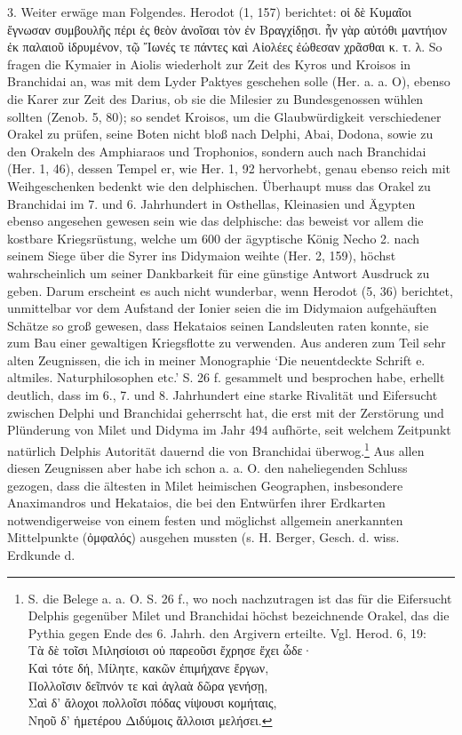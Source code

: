 \documentclass[a4paper, 11pt, oneside]{article}
\begin{document}
3. Weiter erwäge man Folgendes. Herodot (1, 157) berichtet: οἱ δὲ Κυμαῖοι ἔγνωσαν συμβουλῆς πέρι ἐς θεὸν ἀνοῖσαι τὸν ἐν Βραγχίδῃσι. ἦν γὰρ αὐτόθι μαντήιον ἐκ παλαιοῦ ἰδρυμένον, τῷ Ἴωνές τε πάντες καὶ Αἰολέες ἐώθεσαν χρᾶσθαι κ. τ. λ. So fragen die Kymaier in Aiolis wiederholt zur Zeit des Kyros und Kroisos in Branchidai an, was mit dem Lyder Paktyes geschehen solle (Her. a. a. O), ebenso die Karer zur Zeit des Darius, ob sie die Milesier zu Bundesgenossen wühlen sollten (Zenob. 5, 80); so sendet Kroisos, um die Glaubwürdigkeit verschiedener Orakel zu prüfen, seine Boten nicht bloß nach Delphi, Abai, Dodona, sowie zu den Orakeln des Amphiaraos und Trophonios, sondern auch nach Branchidai (Her. 1, 46), dessen Tempel er, wie Her. 1, 92 hervorhebt, genau ebenso reich mit Weihgeschenken bedenkt wie den delphischen. Überhaupt muss das Orakel zu Branchidai im 7. und 6. Jahrhundert in Osthellas, Kleinasien und Ägypten ebenso angesehen gewesen sein wie das delphische: das beweist vor allem die kostbare Kriegsrüstung, welche um 600 der ägyptische König Necho 2. nach seinem Siege über die Syrer ins Didymaion weihte (Her. 2, 159), höchst wahrscheinlich um seiner Dankbarkeit für eine günstige Antwort Ausdruck zu geben. Darum erscheint es auch nicht wunderbar, wenn Herodot (5, 36) berichtet, unmittelbar vor dem Aufstand der Ionier seien die im Didymaion aufgehäuften Schätze so groß gewesen, dass Hekataios seinen Landsleuten raten konnte, sie zum Bau einer gewaltigen Kriegsflotte zu verwenden. Aus anderen zum Teil sehr alten Zeugnissen, die ich in meiner Monographie `Die neuentdeckte Schrift e. altmiles. Naturphilosophen etc.' S. 26 f. gesammelt und besprochen habe, erhellt deutlich, dass im 6., 7. und 8. Jahrhundert eine starke Rivalität und Eifersucht zwischen Delphi und Branchidai geherrscht hat, die erst mit der Zerstörung und Plünderung von Milet und Didyma im Jahr 494 aufhörte, seit welchem Zeitpunkt natürlich Delphis Autorität dauernd die von Branchidai überwog.\footnote{S. die Belege a. a. O. S. 26 f., wo noch nachzutragen ist das für die Eifersucht Delphis gegenüber Milet und Branchidai höchst bezeichnende Orakel, das die Pythia gegen Ende des 6. Jahrh. den Argivern erteilte. Vgl. Herod. 6, 19:\\\hspace*{10mm}Τὰ δὲ τοῖσι Μιλησίοισι οὐ παρεοῦσι ἔχρησε ἔχει ὧδε·\\\hspace*{10mm}Καὶ τότε δή, Μίλητε, κακῶν ἐπιμήχανε ἔργων,\\\hspace*{10mm}Πολλοῖσιν δεῖπνόν τε καὶ ἀγλαὰ δῶρα γενήσῃ,\\\hspace*{10mm}Σαὶ δ' ἄλοχοι πολλοῖσι πόδας νίψουσι κομήταις,\\\hspace*{10mm}Νηοῦ δ' ἡμετέρου Διδύμοις ἄλλοισι μελήσει.} Aus allen diesen Zeugnissen aber habe ich schon a. a. O. den naheliegenden Schluss gezogen, dass die ältesten in Milet heimischen Geographen, insbesondere Anaximandros und Hekataios, die bei den Entwürfen ihrer Erdkarten notwendigerweise von einem festen und möglichst allgemein anerkannten Mittelpunkte (ὀμφαλός) ausgehen mussten (s. H. Berger, Gesch. d. wiss. Erdkunde d. 
\end{document}
